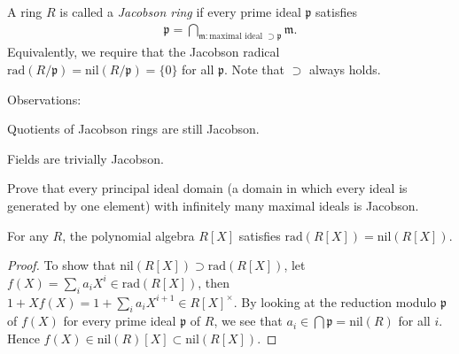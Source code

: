 \begin{definition}\label{def:Jacobson-ring}
	A ring $R$ is called a \emph{Jacobson ring} if every prime ideal $\mathfrak{p}$ satisfies
	\begin{gather}\label{eqn:Hilbert}
		\mathfrak{p} = \bigcap_{\mathfrak{m}: \text{maximal ideal } \supset \mathfrak{p}} \mathfrak{m}.
	\end{gather}
	Equivalently, we require that the Jacobson radical $\text{rad}(R/\mathfrak{p}) = \text{nil}(R/\mathfrak{p}) = \{0\}$ for all $\mathfrak{p}$. Note that $\supset$ always holds.
\end{definition}
Observations:
\begin{compactitem}
	\item Quotients of Jacobson rings are still Jacobson.
	\item Fields are trivially Jacobson.
\end{compactitem}

\begin{exercise}
	Prove that every principal ideal domain (a domain in which every ideal is generated by one element) with infinitely many maximal ideals is Jacobson.
\end{exercise}


\begin{theorem}[E.\ Snapper]\label{prop:Snapper}
	For any $R$, the polynomial algebra $R[X]$ satisfies $\mathrm{rad}(R[X]) = \mathrm{nil}(R[X])$.
\end{theorem}
\begin{proof}
	To show that $\text{nil}(R[X]) \supset \text{rad}(R[X])$, let $f(X) = \sum_i a_i X^i \in \text{rad}(R[X])$, then $1+Xf(X) = 1 + \sum_i a_i X^{i+1} \in R[X]^\times$. By looking at the reduction modulo $\mathfrak{p}$ of $f(X)$ for every prime ideal $\mathfrak{p}$ of $R$, we see that $a_i \in \bigcap \mathfrak{p} = \text{nil}(R)$ for all $i$. Hence $f(X) \in \text{nil}(R)[X] \subset \text{nil}(R[X])$.
\end{proof}

